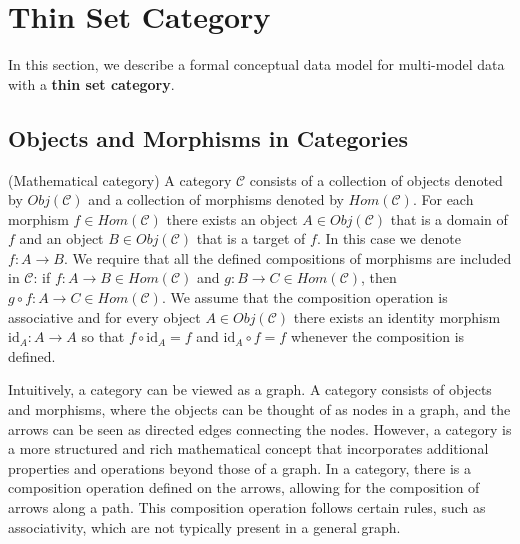 

\section{Thin Set Category}

\nopagebreak

In this section, we describe a formal conceptual data model for multi-model data with a \textbf{thin set category}.

\subsection{Objects and Morphisms in Categories}


\begin{definition}\label{def:category} \cite{MacLane:205493} (Mathematical category) A category $\mathcal{C}$ consists of a collection of objects denoted by $Obj(\mathcal{C})$ and a collection of morphisms denoted by $Hom(\mathcal{C})$.  For each morphism $f \in Hom(\mathcal{C})$ there exists an object $A \in Obj(\mathcal{C})$ that is a domain of $f$ and an object $B \in Obj(\mathcal{C})$ that is a target of $f$. In this case we denote $f \colon A \to B$. We require that all the defined compositions of morphisms are included in $\mathcal{C}$: if $f\colon A \to B \in Hom(\mathcal{C})$ and $g \colon B \to C \in Hom(\mathcal{C})$, then $g \circ f \colon A \to C \in Hom(\mathcal{C})$. We assume that the composition operation is associative and for every object $A \in Obj(\mathcal{C})$ there exists an identity morphism $\text{id}_{A} \colon A \to A$ so that $f \circ \text{id}_{A} = f$ and $\text{id}_{A} \circ f = f$ whenever the composition is defined.
\end{definition}


Intuitively, a category can be viewed as a graph. A category consists of objects and morphisms, where the objects can be thought of as nodes in a graph, and the arrows can be seen as directed edges connecting the nodes. However, a category is a more structured and rich mathematical concept that incorporates additional properties and operations beyond those of a graph. In a category, there is a composition operation defined on the arrows, allowing for the composition of arrows along a path. This composition operation follows certain rules, such as associativity, which are not typically present in a general graph. 



